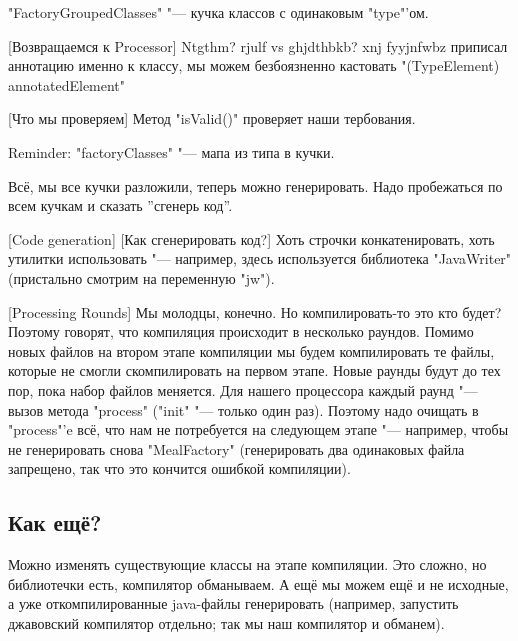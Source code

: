 \java"FactoryGroupedClasses" "--- кучка классов с одинаковым \java"type"'ом.

[Возвращаемся к Processor]
Ntgthm? rjulf vs ghjdthbkb? xnj fyyjnfwbz приписал аннотацию именно к классу, мы можем безбоязненно кастовать
\java"(TypeElement) annotatedElement"

[Что мы проверяем]
Метод \java"isValid()" проверяет наши тербования.

Reminder: \java"factoryClasses" "--- мапа из типа в кучки.

Всё, мы все кучки разложили, теперь можно генерировать.
Надо пробежаться по всем кучкам и сказать ''сгенерь код''.

[Code generation]
[Как сгенерировать код?]
Хоть строчки конкатенировать, хоть утилитки использовать "--- например, здесь используется библиотека \java"JavaWriter" (пристально смотрим на переменную \java"jw").

[Processing Rounds]
Мы молодцы, конечно. Но компилировать-то это кто будет? 
Поэтому говорят, что компиляция происходит в несколько раундов.
Помимо новых файлов на втором этапе компиляции мы будем компилировать 
те файлы, которые не смогли скомпилировать на первом этапе.
Новые раунды будут до тех пор, пока набор файлов меняется.
Для нашего процессора каждый раунд "--- вызов метода \java"process" 
(\java"init" "--- только один раз).
Поэтому надо очищать в \java"process"'e всё, что нам не потребуется на следующем этапе "---
например, чтобы не генерировать снова \java"MealFactory" (генерировать два одинаковых файла запрещено, так что это кончится ошибкой компиляции).

\subsection{Как ещё?}
Можно изменять существующие классы на этапе компиляции.
Это сложно, но библиотечки есть, компилятор обманываем.
А ещё мы можем ещё и не исходные, а уже откомпилированные java-файлы генерировать (например, запустить джавовский компилятор отдельно; так мы наш компилятор и обманем).
